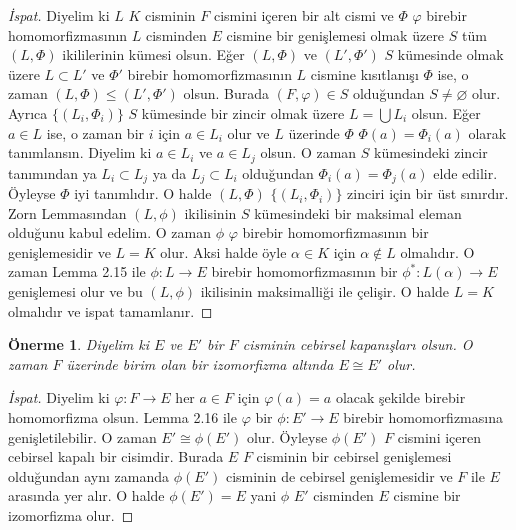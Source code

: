 \documentclass[draft]{article}
\newtheorem{prop}[thm]{Önerme}
\theoremstyle{definition}
\theoremstyle{remark}
\begin{document}
            \begin{proof}[İspat]
                Diyelim ki $L$ $K$ cisminin $F$ cismini içeren bir alt cismi ve $\Phi$ $\varphi$ birebir homomorfizmasının $L$ cisminden $E$ cismine bir genişlemesi olmak üzere $S$ tüm $(L, \Phi)$ ikililerinin kümesi olsun. Eğer $(L, \Phi)$ ve $(L', \Phi')$ $S$ kümesinde olmak üzere $L \subset L'$ ve $\Phi'$ birebir homomorfizmasının $L$ cismine kısıtlanışı $\Phi$ ise, o zaman $(L, \Phi) \leq (L', \Phi')$ olsun. Burada $(F, \varphi) \in S$ olduğundan $S \neq \varnothing$ olur. Ayrıca $\{(L_i, \Phi_i)\}$ $S$ kümesinde bir zincir olmak üzere $L = \bigcup L_i$ olsun. Eğer $a \in L$ ise, o zaman bir $i$ için $a \in L_i$ olur ve $L$ üzerinde $\Phi$ $\Phi(a) = \Phi_i(a)$ olarak tanımlansın. Diyelim ki $a \in L_i$ ve $a \in L_j$ olsun. O zaman $S$ kümesindeki zincir tanımından ya $L_i \subset L_j$ ya da $L_j \subset L_i$ olduğundan $\Phi_i(a) = \Phi_j(a)$ elde edilir. Öyleyse $\Phi$ iyi tanımlıdır. O halde $(L, \Phi)$ $\{(L_i, \Phi_i)\}$ zinciri için bir üst sınırdır. Zorn Lemmasından $(L, \phi)$ ikilisinin $S$ kümesindeki bir maksimal eleman olduğunu kabul edelim. O zaman $\phi$ $\varphi$ birebir homomorfizmasının bir genişlemesidir ve $L = K$ olur. Aksi halde öyle $\alpha \in K$ için $\alpha \notin L$ olmalıdır. O zaman Lemma 2.15 ile $\phi: L \to E$ birebir homomorfizmasının bir $\phi^{*}: L(\alpha) \to E$ genişlemesi olur ve bu $(L, \phi)$ ikilisinin maksimalliği ile çelişir. O halde $L = K$ olmalıdır ve ispat tamamlanır.
            \end{proof}
            
            \begin{prop}
                Diyelim ki $E$ ve $E'$ bir $F$ cisminin cebirsel kapanışları olsun. O zaman $F$ üzerinde birim olan bir izomorfizma altında $E \cong E'$ olur.
            \end{prop}
            
            \begin{proof}[İspat]
                Diyelim ki $\varphi: F \to E$ her $a \in F$ için $\varphi(a) = a$ olacak şekilde birebir homomorfizma olsun. Lemma 2.16 ile $\varphi$ bir $\phi: E' \to E$ birebir homomorfizmasına genişletilebilir. O zaman $E' \cong \phi(E')$ olur. Öyleyse $\phi(E')$ $F$ cismini içeren cebirsel kapalı bir cisimdir. Burada $E$ $F$ cisminin bir cebirsel genişlemesi olduğundan aynı zamanda $\phi(E')$ cisminin de cebirsel genişlemesidir ve $F$ ile $E$ arasında yer alır. O halde $\phi(E') = E$ yani $\phi$ $E'$ cisminden $E$ cismine bir izomorfizma olur.
            \end{proof}
            
\end{document}
